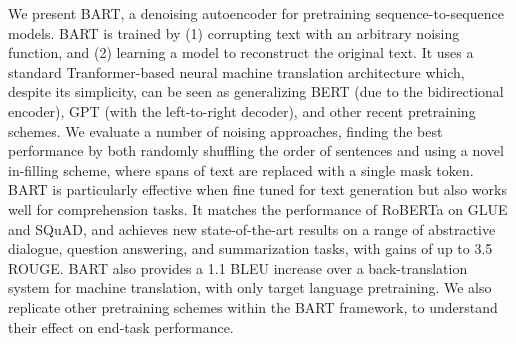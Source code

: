 We present BART, a denoising autoencoder for pretraining sequence-to-sequence models. BART is trained by (1) corrupting text with an arbitrary noising function, and (2) learning a model to reconstruct the original text. It uses a standard Tranformer-based neural machine translation architecture which, despite its simplicity, can be seen as generalizing BERT (due to the bidirectional encoder), GPT (with the left-to-right decoder), and other recent pretraining schemes. We evaluate a number of noising approaches, finding the best performance by both randomly shuffling the order of sentences and using a novel in-filling scheme, where spans of text are replaced with a single mask token. BART is particularly effective when fine tuned for text generation but also works well for comprehension tasks. It matches the performance of RoBERTa on GLUE and SQuAD, and achieves new state-of-the-art results on a range of abstractive dialogue, question answering, and summarization tasks, with gains of up to 3.5 ROUGE. BART also provides a 1.1 BLEU increase over a back-translation system for machine translation, with only target language pretraining. We also replicate other pretraining schemes within the BART framework, to understand their effect on end-task performance.
